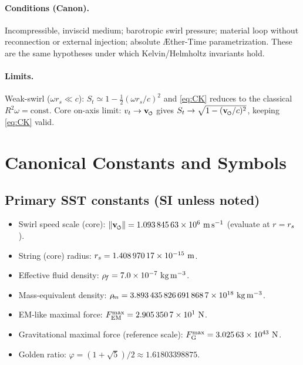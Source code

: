 \documentclass[11pt]{article}
\begin{document}
    \paragraph{Conditions (Canon).}
    Incompressible, inviscid medium; barotropic swirl pressure; material loop without reconnection or
    external injection; absolute Æther-Time parametrization. These are the same hypotheses under which
    Kelvin/Helmholtz invariants hold.

    \paragraph{Limits.}
    Weak-swirl ($\omega r_s\!\ll\!c$): $S_t\simeq 1-\tfrac{1}{2}(\omega r_s/c)^2$ and \eqref{eq:CK} reduces to the
    classical $R^2\omega=\text{const}$. Core on-axis limit: $v_t\to\vswirl$ gives
    $S_t\to \sqrt{1-(\vswirl/c)^2}$, keeping \eqref{eq:CK} valid.


    \section{Canonical Constants and Symbols}

    \subsection*{Primary SST constants (SI unless noted)}
    \begin{itemize}
        \item Swirl speed scale (core): $\vnorm = \num{1.09384563e6}\ \si{m.s^{-1}}$ (evaluate at $r=\rs$).
        \item String (core) radius: $\rs = \num{1.40897017e-15}\ \si{m}$.
        \item Effective fluid density: $\rhof = \num{7.0e-7}\ \si{kg.m^{-3}}$.
        \item Mass-equivalent density: $\rhom = \num{3.8934358266918687e18}\ \si{kg.m^{-3}}$. %
        \item EM-like maximal force: $\FEMmax = \num{2.9053507e1}\ \si{N}$.
        \item Gravitational maximal force (reference scale): $\FGmax = \num{3.02563e43}\ \si{N}$.
        \item Golden ratio: $\varphi = (1+\sqrt{5})/2 \approx \num{1.61803398875}$.
    \end{itemize}
\end{document}
